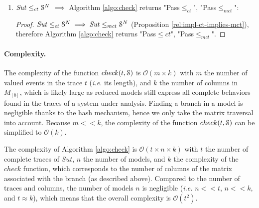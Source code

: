 \begin{enumerate}
    \item $\mathit{Sut} \leq_{ct} \EuScript{S}^N$ $\implies$
        Algorithm \ref{algo:check} returns "Pass$\leq_{ct}$",
        "Pass$\leq_{mct}$":

        \begin{proof}
            $\mathit{Sut} \leq_{ct} \EuScript{S}^{N} \implies
            \mathit{Sut} \leq_{mct} \EuScript{S}^{N}$
            (Proposition \ref{rel:impl-ct-implies-mct}), therefore
            Algorithm \ref{algo:check} returns "Pass$\leq{ct}$",
            "Pass$\leq_{mct}$".
        \end{proof}
\end{enumerate}

\paragraph{Complexity.}
The complexity of the function $check(t, \EuScript{S})$ is
$\mathcal{O}(m \times k)$ with $m$ the number of valued events in
the trace $t$ (\emph{i.e.} its length), and $k$ the number of
columns in $M_{[b]}$, which is likely large as reduced models
still express all complete behaviors found in the traces of a
system under analysis. Finding a branch in a model is negligible
thanks to the hash mechanism, hence we only take the matrix
traversal into account. Because $m << k$, the complexity of the
function $check(t, \EuScript{S})$ can be simplified to
$\mathcal{O}(k)$.

The complexity of Algorithm \ref{algo:check} is $\mathcal{O}(t
\times n \times k)$ with $t$ the number of complete traces of
$\mathit{Sut}$, $n$ the number of models, and $k$ the complexity
of the $check$ function, which corresponds to the number of
columns of the matrix associated with the branch (as described
above). Compared to the number of traces and columns, the number
of models $n$ is negligible (\emph{i.e.} $n << t$, $n << k$, and
$t \approx k$), which means that the overall complexity is
$\mathcal{O}(t^2)$.

\clearpage
